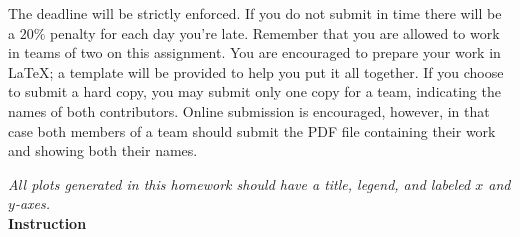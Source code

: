 %
%
%
The deadline will be strictly enforced. If you do not submit in time there will be a $20\%$ penalty for each day you're late. Remember that you are allowed to work in teams of two on this assignment. You are encouraged to prepare your work in \LaTeX{}; a template will be provided to help you put it all together. If you choose  to submit a hard copy, you may submit only one copy for a team, indicating the names of both contributors. Online submission is encouraged, however, in that case both members of a team should submit the PDF file containing  their work and showing both their names.

\emph{All plots generated in this homework should have a title, legend, and labeled $x$ and $y$-axes.} \\[15pt]

\textbf{Instruction}

